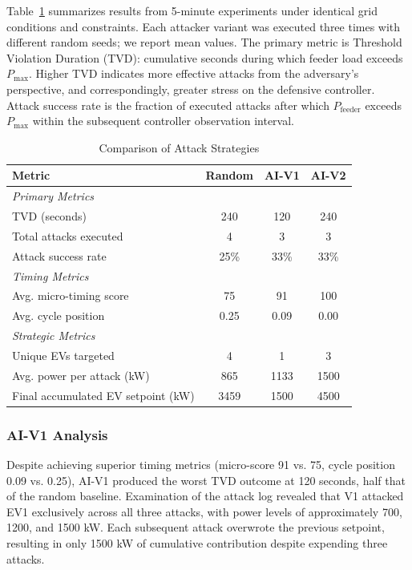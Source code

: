 Table~\ref{tab:results} summarizes results from 5-minute experiments under identical grid conditions and constraints. Each attacker variant was executed three times with different random seeds; we report mean values. The primary metric is Threshold Violation Duration (TVD): cumulative seconds during which feeder load exceeds $P_{\max}$. Higher TVD indicates more effective attacks from the adversary's perspective, and correspondingly, greater stress on the defensive controller. Attack success rate is the fraction of executed attacks after which $P_{\text{feeder}}$ exceeds $P_{\max}$ within the subsequent controller observation interval.

\begin{table}[t]
\centering
\caption{Comparison of Attack Strategies}
\label{tab:results}
\begin{tabular}{lccc}
\toprule
\textbf{Metric} & \textbf{Random} & \textbf{AI-V1} & \textbf{AI-V2} \\
\midrule
\multicolumn{4}{l}{\textit{Primary Metrics}} \\
TVD (seconds) & 240 & 120 & 240 \\
Total attacks executed & 4 & 3 & 3 \\
Attack success rate & 25\% & 33\% & 33\% \\
\midrule
\multicolumn{4}{l}{\textit{Timing Metrics}} \\
Avg. micro-timing score & 75 & 91 & 100 \\
Avg. cycle position & 0.25 & 0.09 & 0.00 \\
\midrule
\multicolumn{4}{l}{\textit{Strategic Metrics}} \\
Unique EVs targeted & 4 & 1 & 3 \\
Avg. power per attack (kW) & 865 & 1133 & 1500 \\
Final accumulated EV setpoint (kW) & 3459 & 1500 & 4500 \\
\bottomrule
\end{tabular}
\end{table}

\subsubsection{AI-V1 Analysis}
Despite achieving superior timing metrics (micro-score 91 vs. 75, cycle position 0.09 vs. 0.25), AI-V1 produced the worst TVD outcome at 120 seconds, half that of the random baseline. Examination of the attack log revealed that V1 attacked EV1 exclusively across all three attacks, with power levels of approximately 700, 1200, and 1500 kW. Each subsequent attack overwrote the previous setpoint, resulting in only 1500 kW of cumulative contribution despite expending three attacks.

